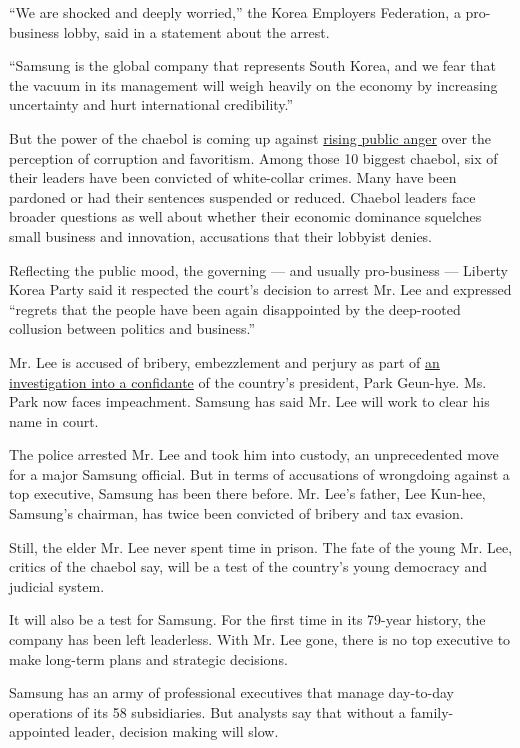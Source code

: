 ``We are shocked and deeply worried,'' the Korea Employers Federation, a
pro-business lobby, said in a statement about the arrest.

``Samsung is the global company that represents South Korea, and we fear
that the vacuum in its management will weigh heavily on the economy by
increasing uncertainty and hurt international credibility.''

But the power of the chaebol is coming up against
\href{https://www.nytimes.com/2017/01/02/world/asia/south-korea-park-geun-hye-samsung.html}{rising
public anger} over the perception of corruption and favoritism. Among
those 10 biggest chaebol, six of their leaders have been convicted of
white-collar crimes. Many have been pardoned or had their sentences
suspended or reduced. Chaebol leaders face broader questions as well
about whether their economic dominance squelches small business and
innovation, accusations that their lobbyist denies.

Reflecting the public mood, the governing --- and usually pro-business
--- Liberty Korea Party said it respected the court's decision to arrest
Mr. Lee and expressed ``regrets that the people have been again
disappointed by the deep-rooted collusion between politics and
business.''

Mr. Lee is accused of bribery, embezzlement and perjury as part of
\href{https://www.nytimes.com/2017/01/02/world/asia/south-korea-park-geun-hye-samsung.html}{an
investigation into a confidante} of the country's president, Park
Geun-hye. Ms. Park now faces impeachment. Samsung has said Mr. Lee will
work to clear his name in court.

The police arrested Mr. Lee and took him into custody, an unprecedented
move for a major Samsung official. But in terms of accusations of
wrongdoing against a top executive, Samsung has been there before. Mr.
Lee's father, Lee Kun-hee, Samsung's chairman, has twice been convicted
of bribery and tax evasion.

Still, the elder Mr. Lee never spent time in prison. The fate of the
young Mr. Lee, critics of the chaebol say, will be a test of the
country's young democracy and judicial system.

It will also be a test for Samsung. For the first time in its 79-year
history, the company has been left leaderless. With Mr. Lee gone, there
is no top executive to make long-term plans and strategic decisions.

Samsung has an army of professional executives that manage day-to-day
operations of its 58 subsidiaries. But analysts say that without a
family-appointed leader, decision making will slow.

